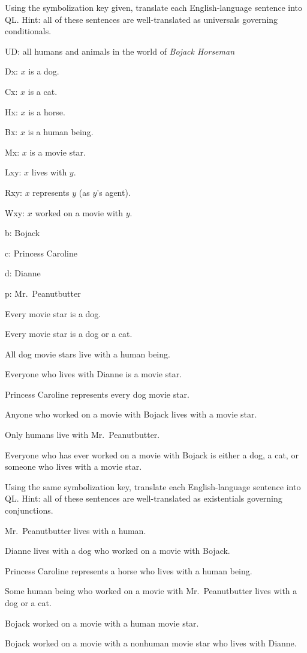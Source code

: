 \problempart
\label{pr.QLbojackall}
Using the symbolization key given, translate each English-language sentence into QL. Hint: all of these sentences are well-translated as universals governing conditionals.
\begin{ekey}
\item[UD:] all humans and animals in the world of \emph{Bojack Horseman}
\item[Dx:] $x$ is a dog.
\item[Cx:] $x$ is a cat.
\item[Hx:] $x$ is a horse.
\item[Bx:] $x$ is a human being.
\item[Mx:] $x$ is a movie star.
\item[Lxy:] $x$ lives with $y$.
\item[Rxy:] $x$ represents $y$ (as $y$'s agent).
\item[Wxy:] $x$ worked on a movie with $y$.
\item[b:] Bojack
\item[c:] Princess Caroline
\item[d:] Dianne
\item[p:] Mr.\ Peanutbutter
\end{ekey}
\begin{earg}
\item Every movie star is a dog.
\item Every movie star is a dog or a cat.
\item All dog movie stars live with a human being.
\item Everyone who lives with Dianne is a movie star.
\item Princess Caroline represents every dog movie star.
\item Anyone who worked on a movie with Bojack lives with a movie star.
\item Only humans live with Mr.\ Peanutbutter.
\item Everyone who has ever worked on a movie with Bojack is either a dog, a cat, or someone who lives with a movie star.
\end{earg}

\solutions
\problempart
\label{pr.QLbojacksome}
Using the same symbolization key, translate each English-language sentence into QL. Hint: all of these sentences are well-translated as existentials governing conjunctions.
\begin{earg}
\item Mr.\ Peanutbutter lives with a human.
\item Dianne lives with a dog who worked on a movie with Bojack.
\item Princess Caroline represents a horse who lives with a human being.
\item Some human being who worked on a movie with Mr.\ Peanutbutter lives with a dog or a cat.
\item Bojack worked on a movie with a human movie star.
\item Bojack worked on a movie with a nonhuman movie star who lives with Dianne.
\end{earg}

